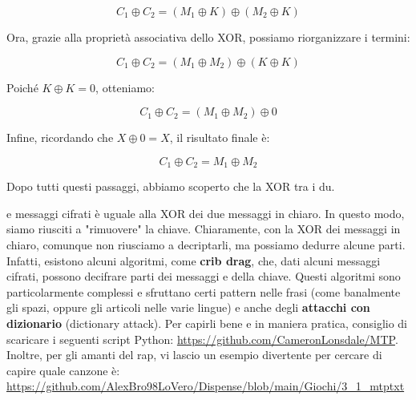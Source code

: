 \documentclass{report}
\begin{document}
\begin{equation*}
    C_1 \oplus C_2 = (M_1 \oplus K ) \oplus (M_2 \oplus K)
\end{equation*}

Ora, grazie alla proprietà associativa dello XOR, possiamo riorganizzare i termini:  

\begin{equation*}
    C_1 \oplus C_2 = (M_1 \oplus M_2 ) \oplus (K \oplus K)
\end{equation*}

Poiché \(K \oplus K = 0\), otteniamo:  

\begin{equation*}
    C_1 \oplus C_2 = (M_1 \oplus M_2 ) \oplus 0
\end{equation*}

Infine, ricordando che \(X \oplus 0 = X\), il risultato finale è:  

\begin{equation*}
    C_1 \oplus C_2 = M_1 \oplus M_2 
\end{equation*}




Dopo tutti questi passaggi, abbiamo scoperto che la XOR tra i du.



e messaggi cifrati è uguale alla XOR dei due messaggi in chiaro. In questo modo, siamo riusciti a "rimuovere" la chiave. Chiaramente, con la XOR dei messaggi in chiaro, comunque non riusciamo a decriptarli, ma possiamo dedurre alcune parti. Infatti, esistono alcuni algoritmi, come \textbf{crib drag}, che, dati alcuni messaggi cifrati, possono decifrare parti dei messaggi e della chiave. Questi algoritmi sono particolarmente complessi e sfruttano certi pattern nelle frasi (come banalmente gli spazi, oppure gli articoli nelle varie lingue) e anche degli \textbf{attacchi con dizionario} (dictionary attack). Per capirli bene e in maniera pratica, consiglio di scaricare i seguenti script Python: \url{https://github.com/CameronLonsdale/MTP}. Inoltre, per gli amanti del rap, vi lascio un esempio divertente per cercare di capire quale canzone è: \url{https://github.com/AlexBro98LoVero/Dispense/blob/main/Giochi/3_1_mtptxt}
\end{document}
